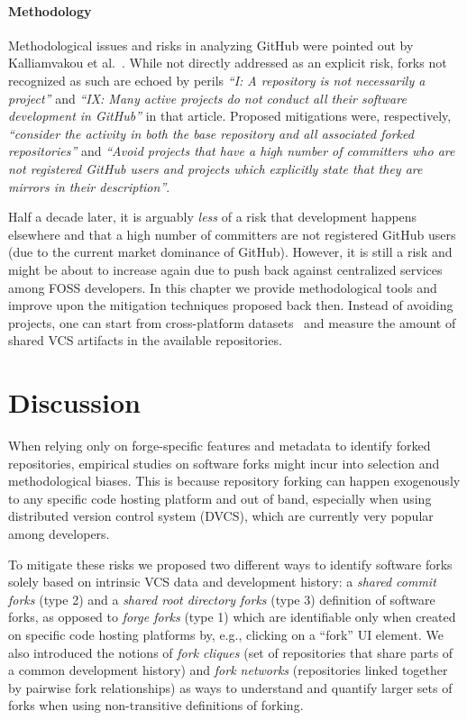 \paragraph{Methodology}

Methodological issues and risks in analyzing GitHub were pointed out by
Kalliamvakou et al.~\cite{kalliamvakou2014promises}. While not directly
addressed as an explicit risk, forks not recognized as such are echoed by
perils \emph{``I: A repository is not necessarily a project''} and \emph{``IX:
  Many active projects do not conduct all their software development in
  GitHub''} in that article. Proposed mitigations were, respectively,
\emph{``consider the activity in both the base repository and all associated
  forked repositories''} and \emph{``Avoid projects that have a high number of
  committers who are not registered GitHub users and projects which explicitly
  state that they are mirrors in their description''}.

Half a decade later, it is arguably \emph{less} of a risk that development
happens elsewhere and that a high number of committers are not registered
GitHub users (due to the current market dominance of GitHub). However, it is
still a risk and might be about to increase again due to push back against
centralized services among FOSS developers.  In this chapter we provide
methodological tools and improve upon the mitigation techniques proposed back
then. Instead of avoiding projects, one can start from cross-platform
datasets~\cite{swhcacm2018, swh-provenance-emse, swh-msr2019-dataset,
mockus2019woc} and measure the amount of shared VCS artifacts in the available
repositories.


\section{Discussion}
\label{sec:forks-conclusion}

When relying only on forge-specific features and metadata to identify forked
repositories, empirical studies on software forks might incur into selection
and methodological biases. This is because repository forking can happen
exogenously to any specific code hosting platform and out of band, especially
when using distributed version control system (DVCS), which are currently very
popular among developers.

To mitigate these risks we proposed two different ways to identify software
forks solely based on intrinsic VCS data and development history: a
\emph{shared commit forks} (type 2) and a \emph{shared root directory forks}
(type 3) definition of software forks, as opposed to \emph{forge forks} (type
1) which are identifiable only when created on specific code hosting platforms
by, e.g., clicking on a ``fork'' UI element.  We also introduced the notions of
\emph{fork cliques} (set of repositories that share parts of a common
development history) and \emph{fork networks} (repositories linked together by
pairwise fork relationships) as ways to understand and quantify larger sets of
forks when using non-transitive definitions of forking.

